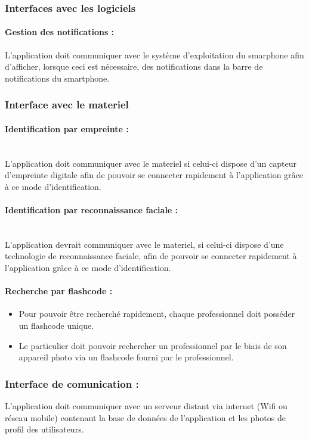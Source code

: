 \documentclass{article}
\begin{document}
\subsubsection{Interfaces avec les logiciels}
\paragraph{Gestion des notifications :}
L'application doit communiquer avec le système d'exploitation du
smarphone afin d'afficher, lorsque ceci est nécessaire, des
notifications dans la barre de notifications du smartphone.

\subsubsection{Interface avec le materiel}
\paragraph{Identification par empreinte :}
~~\\
L'application doit communiquer avec le materiel si celui-ci dispose
d'un capteur d'empreinte digitale afin de pouvoir se connecter rapidement à
l'application grâce à ce mode d'identification.
\paragraph{Identification par reconnaissance faciale :}
~~\\
L'application devrait communiquer avec le materiel, si celui-ci dispose
d'une technologie de reconnaissance faciale, afin de pouvoir se
connecter rapidement à l'application grâce à ce mode
d'identification.
\paragraph{Recherche par flashcode :}
\begin{itemize}
\item Pour pouvoir être recherché rapidement, chaque professionnel
  doit posséder un flashcode unique.
\item Le particulier doit pouvoir rechercher un professionnel par le
  biais de son appareil photo via un flashcode fourni par le
  professionnel.
\end{itemize}

\subsubsection{Interface de comunication :}
L'application doit communiquer avec un serveur distant via internet
(Wifi ou réseau mobile) contenant la base de données de l'application et
les photos de profil des utilisateurs.
\end{document}
